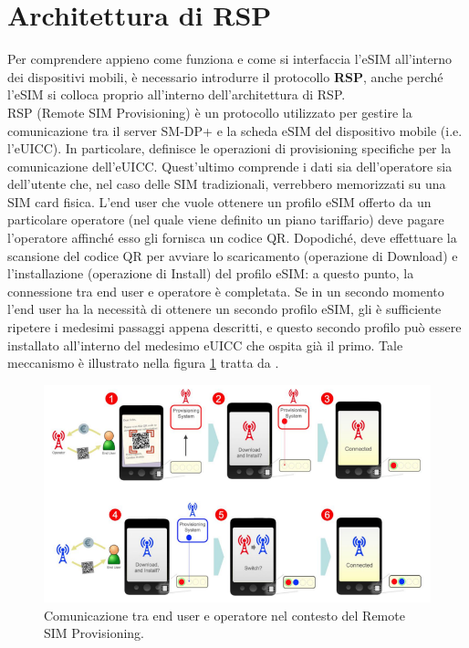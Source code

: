 \documentclass[10pt, oneside]{book}
\begin{document}
\section{Architettura di RSP}
Per comprendere appieno come funziona e come si interfaccia l'eSIM all'interno dei dispositivi mobili, è necessario introdurre il protocollo \textbf{RSP}, anche perché l'eSIM si colloca proprio all'interno dell'architettura di RSP.\\
RSP (Remote SIM Provisioning) è un protocollo utilizzato per gestire la comunicazione tra il server SM-DP+ e la scheda eSIM del dispositivo mobile (i.e. l'eUICC). In particolare, definisce le operazioni di provisioning specifiche per la comunicazione dell'eUICC. Quest'ultimo comprende i dati sia dell'operatore sia dell'utente che, nel caso delle SIM tradizionali, verrebbero memorizzati su una SIM card fisica. L'end user che vuole ottenere un profilo eSIM offerto da un particolare operatore (nel quale viene definito un piano tariffario) deve pagare l'operatore affinché esso gli fornisca un codice QR. Dopodiché, deve effettuare la scansione del codice QR per avviare lo scaricamento (operazione di Download) e l'installazione (operazione di Install) del profilo eSIM: a questo punto, la connessione tra end user e operatore è completata. Se in un secondo momento l'end user ha la necessità di ottenere un secondo profilo eSIM, gli è sufficiente ripetere i medesimi passaggi appena descritti, e questo secondo profilo può essere installato all'interno del medesimo eUICC che ospita già il primo. Tale meccanismo è illustrato nella figura \ref{fig:RSP-functioning} tratta da \cite{GSMA-whitepaper}.
\begin{figure}
\includegraphics[width=\linewidth]{RSP-functioning.png}
\caption{Comunicazione tra end user e operatore nel contesto del Remote SIM Provisioning.}
\label{fig:RSP-functioning}
\end{figure}
\end{document}
